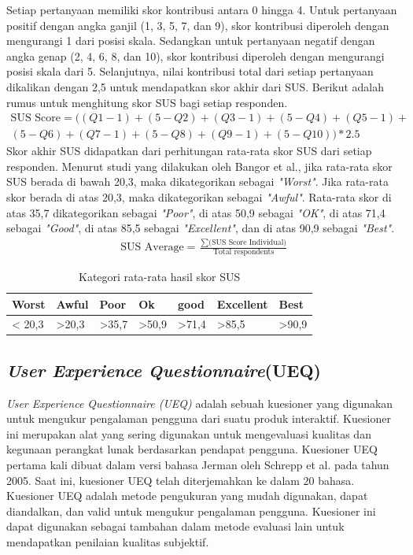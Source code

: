Setiap pertanyaan memiliki skor kontribusi antara 0 hingga 4. 
Untuk pertanyaan positif dengan angka ganjil (1, 3, 5, 7, dan 9), skor kontribusi diperoleh dengan mengurangi 1 dari posisi skala.
Sedangkan untuk pertanyaan negatif dengan angka genap (2, 4, 6, 8, dan 10), skor kontribusi diperoleh dengan mengurangi posisi skala dari 5.
Selanjutnya, nilai kontribusi total dari setiap pertanyaan dikalikan dengan 2,5 untuk mendapatkan skor akhir dari SUS. Berikut adalah rumus untuk menghitung skor SUS bagi setiap responden.
\begin{equation}
\begin{split}
	\text{SUS Score} = ((Q1-1)+(5-Q2)+(Q3-1)+(5-Q4)+(Q5-1)+ \\ 
	(5-Q6)+(Q7-1)+(5-Q8)+(Q9-1)+(5-Q10))*2.5
\end{split}
\end{equation}
Skor akhir SUS didapatkan dari perhitungan rata-rata skor SUS dari setiap responden.
Menurut studi yang dilakukan oleh Bangor et al., 
jika rata-rata skor SUS berada di bawah 20,3, maka dikategorikan sebagai \textit{"Worst"}.
Jika rata-rata skor berada di atas 20,3, maka dikategorikan sebagai\textit{ "Awful"}. 
Rata-rata skor di atas 35,7 dikategorikan sebagai \textit{"Poor"}, di atas 50,9 sebagai \textit{"OK"}, di atas 71,4 sebagai \textit{"Good"}, di atas 85,5 sebagai \textit{"Excellent"}, dan di atas 90,9 sebagai \textit{"Best"}.
\begin{equation}
	\begin{split}
		\text{SUS Average} = \frac{\sum \text{(SUS Score Individual)}}{\text{Total respondents}} 
	\end{split}
	\label{Perhitungan rata-rata skor SUS}
\end{equation}
\begin{table}[htbp]
	\centering
	\caption{Kategori rata-rata hasil skor SUS}
	\begin{tabular}{|m{}|m{}|m{}|m{}|m{}|m{}|m{}|}
		\hline
		Worst & Awful & Poor & Ok & good & Excellent & Best \\
		\hline
		< 20,3 & >20,3 & >35,7& >50,9 & >71,4& >85,5 & >90,9 \\
		\hline
	\end{tabular}
\end{table}

\subsection{\textit{User Experience Questionnaire}(UEQ)}
\textit{User Experience Questionnaire (UEQ)} adalah sebuah kuesioner yang digunakan untuk mengukur pengalaman pengguna dari suatu produk interaktif.
Kuesioner ini merupakan alat yang sering digunakan untuk mengevaluasi kualitas dan kegunaan perangkat lunak berdasarkan pendapat pengguna. 
Kuesioner UEQ pertama kali dibuat dalam versi bahasa Jerman oleh Schrepp et al. pada tahun 2005.
Saat ini, kuesioner UEQ telah diterjemahkan ke dalam 20 bahasa. Kuesioner UEQ adalah metode pengukuran yang mudah digunakan, dapat diandalkan, dan valid untuk mengukur pengalaman pengguna.
Kuesioner ini dapat digunakan sebagai tambahan dalam metode evaluasi lain untuk mendapatkan penilaian kualitas subjektif.

